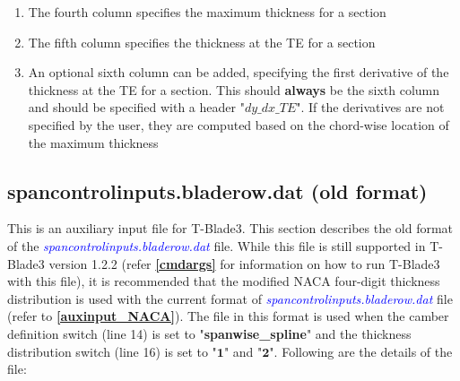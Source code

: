 \documentclass[8pt]{article}
\begin{document}
\begin{itemize}[leftmargin=*]
\begin{enumerate}[label=\alph*]
        \item The fourth column specifies the maximum thickness for a section
        \item The fifth column specifies the thickness at the TE for a section
        \item An optional sixth column can be added, specifying the first derivative of the thickness at the TE for a section. This should \textbf{always} be the sixth column and should be specified with a header "$dy\_dx\_TE$". If the derivatives are not specified by the user, they are computed based on the chord-wise location of the maximum thickness
    \end{enumerate}
\end{itemize}

\subsection{spancontrolinputs.bladerow.dat (old format)}\label{auxinput1}
\noindent
This is an auxiliary input file for T-Blade3. This section describes the old format of the \textit{\textcolor{blue}{spancontrolinputs.bladerow.dat}} file. While this file is still supported in T-Blade3 version 1.2.2 (refer \textbf{\ref{cmdargs}} for information on how to run T-Blade3 with this file), it is recommended that the modified NACA four-digit thickness distribution is used with the current format of \textit{\textcolor{blue}{spancontrolinputs.bladerow.dat}} file (refer to \textbf{\ref{auxinput_NACA}}). The file in this format is used when the camber definition switch (line 14) is set to "\textbf{spanwise\_spline}" and the thickness distribution switch (line 16) is set to "$\mathbf{1}$" and "$\mathbf{2}$". Following are the details of the file:
\end{document}

